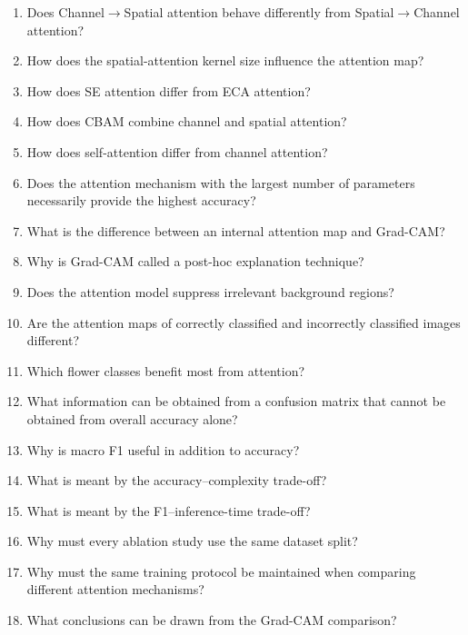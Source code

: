 \documentclass[10pt]{article}
\begin{document}
\begin{enumerate}
\item Does Channel$\rightarrow$Spatial attention behave differently from
Spatial$\rightarrow$Channel attention?

\item How does the spatial-attention kernel size influence the attention map?

\item How does SE attention differ from ECA attention?

\item How does CBAM combine channel and spatial attention?

\item How does self-attention differ from channel attention?

\item Does the attention mechanism with the largest number of parameters
necessarily provide the highest accuracy?

\item What is the difference between an internal attention map and Grad-CAM?

\item Why is Grad-CAM called a post-hoc explanation technique?

\item Does the attention model suppress irrelevant background regions?

\item Are the attention maps of correctly classified and incorrectly
classified images different?

\item Which flower classes benefit most from attention?

\item What information can be obtained from a confusion matrix that cannot
be obtained from overall accuracy alone?

\item Why is macro F1 useful in addition to accuracy?

\item What is meant by the accuracy--complexity trade-off?

\item What is meant by the F1--inference-time trade-off?

\item Why must every ablation study use the same dataset split?

\item Why must the same training protocol be maintained when comparing
different attention mechanisms?

\item What conclusions can be drawn from the Grad-CAM comparison?

\end{enumerate}
\end{document}
